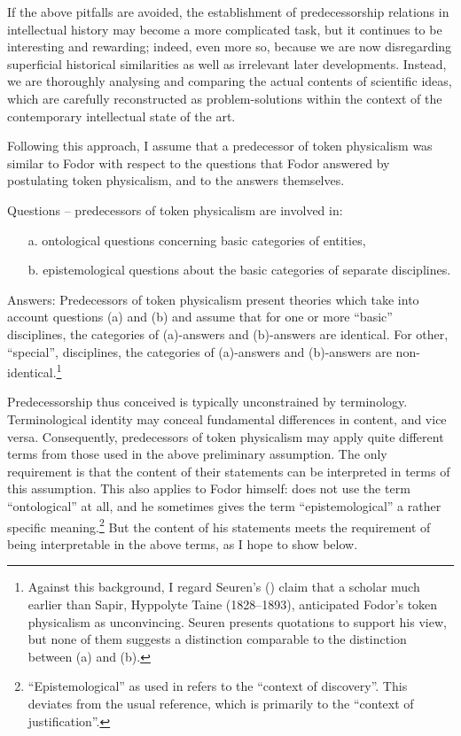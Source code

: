 \documentclass[output=paper]{langscibook}
\begin{document}
If the above pitfalls are avoided, the establishment of predecessorship relations in intellectual history may become a more complicated task, but it continues to be interesting and rewarding; indeed, even more so, because we are now disregarding superficial historical similarities as well as irrelevant later developments. Instead, we are thoroughly analysing and comparing the actual contents of scientific ideas, which are carefully reconstructed as problem-solutions within the context of the contemporary intellectual state of the art.

Following this approach, I assume that a predecessor of token physicalism was similar to Fodor with respect to the questions that Fodor answered by postulating token physicalism, and to the answers themselves.

Questions – predecessors of token physicalism are involved in:

\begin{enumerate}
    \item[a.] ontological questions concerning basic categories of entities,
    \item[b.] epistemological questions about the basic categories of separate disciplines.
\end{enumerate}

Answers: Predecessors of token physicalism present theories which take into account questions (a) and (b) and assume that for one or more ``basic'' disciplines, the categories of (a)-answers and (b)-answers are identical. For other, ``special'', disciplines, the categories of (a)-answers and (b)-answers are non-identical.\footnote{Against this background, I regard Seuren's (\citeyear[827-832]{Seuren2016}) claim that a scholar much earlier than Sapir, Hyppolyte Taine (1828–1893), anticipated Fodor's token physicalism as unconvincing. Seuren presents quotations to support his view, but none of them suggests a distinction comparable to the distinction between (a) and (b).}

Predecessorship thus conceived is typically unconstrained by terminology. Terminological identity may conceal fundamental differences in content, and vice versa. Consequently, predecessors of token physicalism may apply quite different terms from those used in the above preliminary assumption. The only requirement is that the content of their statements can be interpreted in terms of this assumption. This also applies to Fodor himself: \citet{Fodor1974} does not use the term ``ontological'' at all, and he sometimes gives the term ``epistemological'' a rather specific meaning.\footnote{``Epistemological'' as used in \citet[113]{Fodor1974} refers to the ``context of discovery''. This deviates from the usual reference, which is primarily to the ``context of justification''.\label{fn:elffers:6}} But the content of his statements meets the requirement of being interpretable in the above terms, as I hope to show below.
\end{document}
